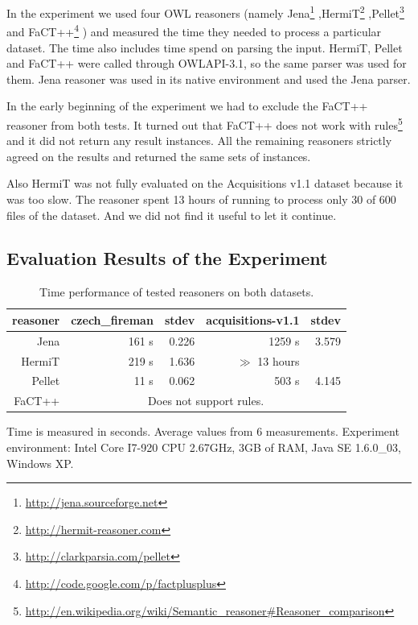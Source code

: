 In the experiment we used four OWL reasoners (namely
Jena\footnote{\url{http://jena.sourceforge.net}}
,HermiT\footnote{\url{http://hermit-reasoner.com}}
,Pellet\footnote{\url{http://clarkparsia.com/pellet}}
and FaCT++\footnote{\url{http://code.google.com/p/factplusplus}}
) and measured the time they needed to process a particular dataset. The time also includes time spend on parsing the input. HermiT, Pellet and FaCT++ were called through OWLAPI-3.1, so the same parser was used for them. Jena reasoner was used in its native environment and used the Jena parser.

In the early beginning of the experiment we had to exclude the FaCT++ reasoner from both tests. It turned out that FaCT++ does not work with rules\footnote{\url{http://en.wikipedia.org/wiki/Semantic_reasoner#Reasoner_comparison}} and it did not return any result instances.  All the remaining reasoners strictly agreed on the results and returned the same sets of instances.

Also HermiT was not fully evaluated on the Acquisitions v1.1 dataset because it was too slow. The reasoner spent 13 hours of running to process only 30 of 600 files of the dataset. And we did not find it useful to let it continue.












\subsection{Evaluation Results of the Experiment}






\begin{table}
\begin{center}
\begin{tabular}{|r||r|r||r|r|}
\hline
reasoner & \textbf{czech\_fireman} & stdev & \textbf{acquisitions-v1.1} & stdev\\
\hline
\hline
Jena & 161 s & 0.226 & 1259 s & 3.579\\
\hline
HermiT & 219 s & 1.636 & $\gg$ 13 hours & \\
\hline
Pellet & 11 s & 0.062 & 503 s & 4.145\\
\hline
FaCT++ & \multicolumn{4}{|c|}{Does not support rules.}\\
\hline
\end{tabular}
\end{center}

Time is measured in seconds. Average values from 6 measurements. Experiment environment: Intel Core I7-920 CPU 2.67GHz, 3GB of RAM, Java SE 1.6.0\_03, Windows XP.

\caption{Time performance of tested reasoners on both datasets.}
\label{tab:results}
\end{table}

